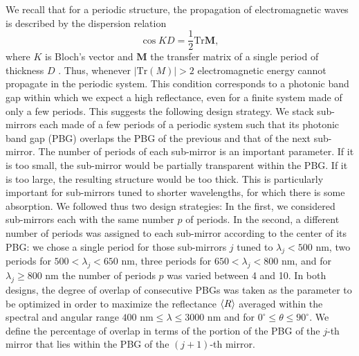 \documentclass[a4paper,fleqn]{cas-sc}
\begin{document}
We recall that for a periodic structure, the propagation of
electromagnetic waves is described by the dispersion relation
\begin{equation}
        \cos KD = \frac{1}{2} \text{Tr} \bm M,   \label{Dispersion}
\end{equation}
where $K$ is Bloch's vector and $\bm M$ the transfer matrix of a single
period of thickness $D$ \cite{Mochan1987, Mochan1988,
        Perez2018}. Thus,
whenever $\left\vert\text {Tr} \left(M \right) \right\vert>2$
electromagnetic energy cannot propagate in the periodic system. This condition corresponds to a
photonic band gap within which we
expect a high reflectance, even for a finite system made of only a few periods. This suggests
the following design strategy. We stack sub-mirrors
each made of a few periods of a periodic system such that its photonic band gap
(PBG) overlaps the PBG of the previous and that of the next
sub-mirror. The number of periods of each sub-mirror is an
important parameter. If it is too small, the sub-mirror would be
partially transparent within the PBG. If it is too large, the
resulting structure would be too thick. This is particularly important
for sub-mirrors tuned to shorter wavelengths, for which there is some
absorption. We followed thus two design
strategies: In the first, we considered sub-mirrors each with the same
number $p$ of periods. In the second, a different number of periods was
assigned to each sub-mirror according to the center of its PBG: we chose
a single period for those sub-mirrors $j$ tuned to
$\lambda_{j}<500$ nm, two periods for $500 <\lambda_ {j} < 650$ nm,
three periods for $650<\lambda_ {j}<800$ nm, and for
$\lambda_{j} \geq 800$ nm the number of periods $p$ was varied between
4 and 10. In both designs, the degree of overlap of consecutive PBGs was
taken as the parameter to be optimized in order to maximize
the reflectance $\braket{R}$ averaged within the spectral and
angular range $400\text{ nm}\le
\lambda\le 3000\text{ nm}$ and for $0^\circ\le\theta\le90^\circ$.
We define the percentage of overlap in terms of the portion of the PBG of the
$j$-th mirror that lies within the PBG of the $(j + 1)$-th
mirror.
\end{document}
